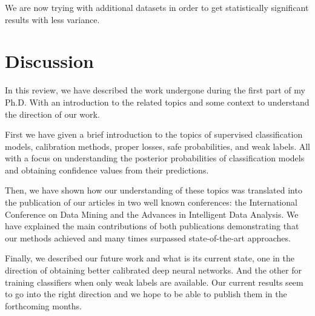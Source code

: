\documentclass[a4paper, 12pt]{article}
\begin{document}
We are now trying with additional datasets in order to get statistically significant results with less variance.

\section{Discussion}

In this review, we have described the work undergone during the first part of my Ph.D. With an introduction to the related topics and some context to understand the direction of our work.

First we have given a brief introduction to the topics of supervised classification models, calibration methods, proper losses, safe probabilities, and weak labels.
All with a focus on understanding the posterior probabilities of classification models and obtaining confidence values from their predictions.

Then, we have shown how our understanding of these topics was translated into the publication of our articles in two well known conferences: the International Conference on Data Mining and the Advances in Intelligent Data Analysis.
We have explained the main contributions of both publications demonstrating that our methods achieved and many times surpassed state-of-the-art approaches.

Finally, we described our future work and what is its current state, one in the direction of obtaining better calibrated deep neural networks.
And the other for training classifiers when only weak labels are available.
Our current results seem to go into the right direction and we hope to be able to publish them in the forthcoming months.



\end{document}

